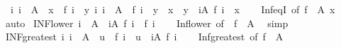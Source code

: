\begin{isabellebody}
\ \ {\isachardoublequoteopen}{\isacharparenleft}{\kern0pt}{\isasymAnd}i{\isachardot}{\kern0pt}\ i\ {\isasymin}\ A\ {\isasymLongrightarrow}\ x\ {\isasymle}\ f\ i{\isacharparenright}{\kern0pt}\ {\isasymLongrightarrow}\ {\isacharparenleft}{\kern0pt}{\isasymAnd}y{\isachardot}{\kern0pt}\ {\isacharparenleft}{\kern0pt}{\isasymAnd}i{\isachardot}{\kern0pt}\ i\ {\isasymin}\ A\ {\isasymLongrightarrow}\ f\ i\ {\isasymge}\ y{\isacharparenright}{\kern0pt}\ {\isasymLongrightarrow}\ x\ {\isasymge}\ y{\isacharparenright}{\kern0pt}\ {\isasymLongrightarrow}\ {\isacharparenleft}{\kern0pt}{\isasymSqinter}i{\isasymin}A{\isachardot}{\kern0pt}\ f\ i{\isacharparenright}{\kern0pt}\ {\isacharequal}{\kern0pt}\ x{\isachardoublequoteclose}\isanewline
%
\isadelimproof
\ \ %
\endisadelimproof
%
\isatagproof
{}\isamarkupfalse%
\ Inf{\isacharunderscore}{\kern0pt}eqI\ {\isacharbrackleft}{\kern0pt}of\ {\isachardoublequoteopen}f\ {\isacharbackquote}{\kern0pt}\ A{\isachardoublequoteclose}\ x{\isacharbrackright}{\kern0pt}\ \isamarkupfalse%
\ auto%
\endisatagproof
{\isafoldproof}%
%
\isadelimproof
\isanewline
%
\endisadelimproof
\isanewline
{}\isamarkupfalse%
\ INF{\isacharunderscore}{\kern0pt}lower{\isacharcolon}{\kern0pt}\ {\isachardoublequoteopen}i\ {\isasymin}\ A\ {\isasymLongrightarrow}\ {\isacharparenleft}{\kern0pt}{\isasymSqinter}i{\isasymin}A{\isachardot}{\kern0pt}\ f\ i{\isacharparenright}{\kern0pt}\ {\isasymle}\ f\ i{\isachardoublequoteclose}\isanewline
%
\isadelimproof
\ \ %
\endisadelimproof
%
\isatagproof
{}\isamarkupfalse%
\ Inf{\isacharunderscore}{\kern0pt}lower\ {\isacharbrackleft}{\kern0pt}of\ {\isacharunderscore}{\kern0pt}\ {\isachardoublequoteopen}f\ {\isacharbackquote}{\kern0pt}\ A{\isachardoublequoteclose}{\isacharbrackright}{\kern0pt}\ \isamarkupfalse%
\ simp%
\endisatagproof
{\isafoldproof}%
%
\isadelimproof
\isanewline
%
\endisadelimproof
\isanewline
{}\isamarkupfalse%
\ INF{\isacharunderscore}{\kern0pt}greatest{\isacharcolon}{\kern0pt}\ {\isachardoublequoteopen}{\isacharparenleft}{\kern0pt}{\isasymAnd}i{\isachardot}{\kern0pt}\ i\ {\isasymin}\ A\ {\isasymLongrightarrow}\ u\ {\isasymle}\ f\ i{\isacharparenright}{\kern0pt}\ {\isasymLongrightarrow}\ u\ {\isasymle}\ {\isacharparenleft}{\kern0pt}{\isasymSqinter}i{\isasymin}A{\isachardot}{\kern0pt}\ f\ i{\isacharparenright}{\kern0pt}{\isachardoublequoteclose}\isanewline
%
\isadelimproof
\ \ %
\endisadelimproof
%
\isatagproof
{}\isamarkupfalse%
\ Inf{\isacharunderscore}{\kern0pt}greatest\ {\isacharbrackleft}{\kern0pt}of\ {\isachardoublequoteopen}f\ {\isacharbackquote}{\kern0pt}\ A{\isachardoublequoteclose}{\isacharbrackright}{\kern0pt}\ \isamarkupfalse%

\end{isabellebody}
